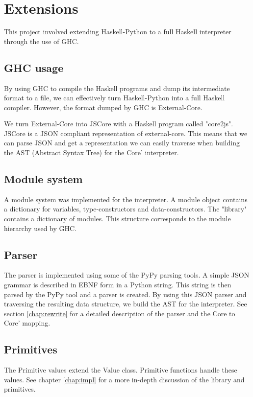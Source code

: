 \section{Extensions}

This project involved extending Haskell-Python to a full Haskell interpreter 
through the use of GHC.

\subsection*{GHC usage}


By using GHC to compile the Haskell programs and dump its intermediate
format to a file, we can effectively turn Haskell-Python into a full
Haskell compiler. However, the format dumped by GHC is External-Core.

We turn External-Core into JSCore with a Haskell program called "core2js".
JSCore is a JSON compliant representation of external-core. This means that
we can parse JSON and get a representation we can easily traverse when building
the AST (Abstract Syntax Tree) for the Core' interpreter.

\subsection*{Module system}

A module system was implemented for the interpreter. A module object contains
a dictionary for variables, type-constructors and data-constructors. The 
"library" contains a dictionary of modules. This structure corresponds to the
module hierarchy used by GHC.

\subsection*{Parser}


The parser is implemented using some of the PyPy parsing tools. A simple 
JSON grammar is described in EBNF form in a Python string. This string
is then parsed by the PyPy tool and a parser is created. By using this JSON
parser and traversing the resulting data structure, we build the AST for the 
interpreter. See section \ref{chap:rewrite} for a detailed description of 
the parser and the Core to Core' mapping.

\subsection*{Primitives}

The Primitive values extend the Value class. Primitive functions handle
these values.
See chapter \ref{chap:impl} for a more in-depth discussion of the
library and primitives.

